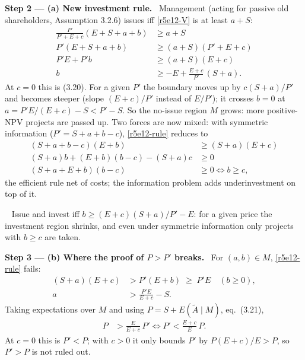 \documentclass[11pt,a4paper]{article}
\newcommand{\step}[2]{\par\medskip\noindent\textbf{Step #1 --- #2.}~}
\newcommand{\answer}[1]{\par\smallskip\noindent\fbox{\textbf{Answer #1.}}~}
\begin{document}
\step{2}{(a) New investment rule} Management (acting for passive old shareholders, Assumption 3.2.6) issues iff \eqref{r5e12-V} is at least $a+S$:
\begin{align}
  \frac{P'}{P'+E+c}(E+S+a+b) &\ge a+S \nonumber\\
  P'(E+S+a+b) &\ge (a+S)(P'+E+c) \nonumber\\
  P'E + P'b &\ge (a+S)(E+c) \nonumber\\
  b &\ge -E + \frac{E+c}{P'}\,(S+a). \label{r5e12-rule}
\end{align}
At $c=0$ this is (3.20). For a given $P'$ the boundary moves up by $c(S+a)/P'$ and becomes steeper (slope $(E+c)/P'$ instead of $E/P'$); it crosses $b=0$ at $a=P'E/(E+c)-S<P'-S$. So the no-issue region $M$ grows: more positive-NPV projects are passed up. Two forces are now mixed: with symmetric information ($P'=S+a+b-c$), \eqref{r5e12-rule} reduces to
\begin{align}
  (S+a+b-c)(E+b) &\ge (S+a)(E+c) \nonumber\\
  (S+a)b + (E+b)(b-c) - (S+a)c &\ge 0 \nonumber\\
  (S+a+E+b)(b-c) &\ge 0 \iff b \ge c, \nonumber
\end{align}
the efficient rule net of costs; the information problem adds underinvestment on top of it.
\answer{(a)} Issue and invest iff $b\ge (E+c)(S+a)/P' - E$: for a given price the investment region shrinks, and even under symmetric information only projects with $b\ge c$ are taken.

\step{3}{(b) Where the proof of $P>P'$ breaks} For $(a,b)\in M$, \eqref{r5e12-rule} fails:
\begin{align}
  (S+a)(E+c) &> P'(E+b) \;\ge\; P'E \quad (b\ge0), \nonumber\\
  a &> \frac{P'E}{E+c} - S. \nonumber
\end{align}
Taking expectations over $M$ and using $P=S+E(\widetilde A\mid M)$, eq.~(3.21),
\begin{align}
  P &> \frac{E}{E+c}\,P' \iff P' < \frac{E+c}{E}\,P. \label{r5e12-bound}
\end{align}
At $c=0$ this is $P'<P$; with $c>0$ it only bounds $P'$ by $P(E+c)/E>P$, so $P'>P$ is not ruled out.
\end{document}
